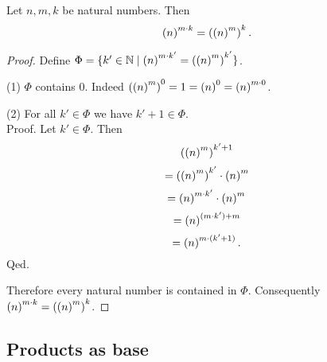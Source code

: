 \documentclass[../arithmetic.tex]{subfiles}
\begin{document}
  \begin{forthel}
    \begin{proposition}
      Let $n, m, k$ be natural numbers.
      Then \[ \left(n\right)^{m \cdot k} = \left(\left(n\right)^{m}\right)^{k}. \]
    \end{proposition}
    \begin{proof}
      Define $\Phi = \{ k' \in \mathbb{N} \mid \left(n\right)^{m \cdot k'} = \left(\left(n\right)^{m}\right)^{k'} \}$.

      (1) $\Phi$ contains $0$.
      Indeed $\left(\left(n\right)^{m}\right)^{0}
        = 1
        = \left(n\right)^{0}
        = \left(n\right)^{m \cdot 0}$.

      (2) For all $k' \in \Phi$ we have $k' \plus 1 \in \Phi$. \\
      Proof.
        Let $k' \in \Phi$.
        Then
        \[  \left(\left(n\right)^{m}\right)^{k' + 1}                \]
        \[    = \left(\left(n\right)^{m}\right)^{k'} \cdot \left(n\right)^{m}    \]
        \[    = \left(n\right)^{m \cdot k'} \cdot \left(n\right)^{m}  \]
        \[    = \left(n\right)^{(m \cdot k') + m}        \]
        \[    = \left(n\right)^{m \cdot (k' + 1)}.       \]
      Qed.

      Therefore every natural number is contained in $\Phi$.
      Consequently $\left(n\right)^{m \cdot k} = \left(\left(n\right)^{m}\right)^{k}$.
    \end{proof}
  \end{forthel}


  \subsection*{Products as base}
\end{document}
